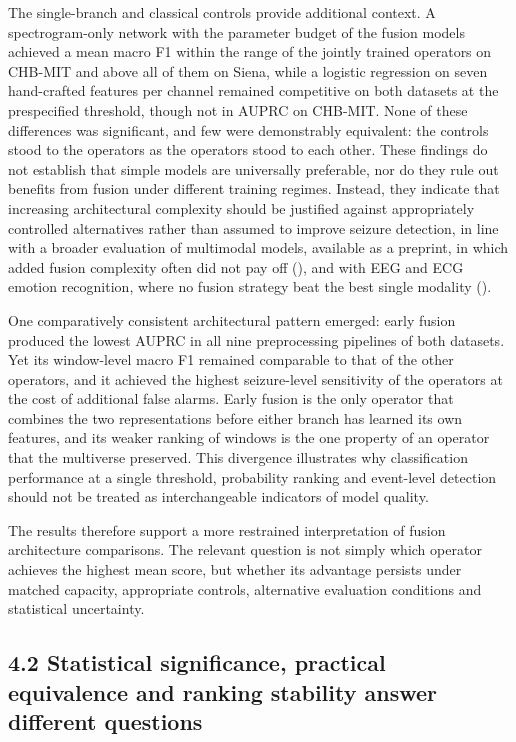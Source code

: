 \documentclass[11pt,a4paper]{article}
\begin{document}
The single-branch and classical controls provide additional context. A spectrogram-only
network with the parameter budget of the fusion models achieved a mean macro F1 within
the range of the jointly trained operators on CHB-MIT and above all of them on Siena,
while a logistic regression on seven hand-crafted features per channel remained
competitive on both datasets at the prespecified threshold, though not in AUPRC on
CHB-MIT. None of these differences was significant, and few were demonstrably
equivalent: the controls stood to the operators as the operators stood to each other.
These findings do not establish that simple models are universally preferable, nor do
they rule out benefits from fusion under different training regimes. Instead, they
indicate that increasing architectural complexity should be justified against
appropriately controlled alternatives rather than assumed to improve seizure detection,
in line with a broader evaluation of multimodal models, available as a preprint, in
which added fusion complexity often did not pay off (\citealp{Rheude_2025}), and with EEG and
ECG emotion recognition, where no fusion strategy beat the best single modality
(\citealp{Miantezila_Junior_2026}).

One comparatively consistent architectural pattern emerged: early fusion produced the
lowest AUPRC in all nine preprocessing pipelines of both datasets. Yet its window-level
macro F1 remained comparable to that of the other operators, and it achieved the highest
seizure-level sensitivity of the operators at the cost of additional false alarms. Early
fusion is the only operator that combines the two representations before either branch
has learned its own features, and its weaker ranking of windows is the one property of
an operator that the multiverse preserved. This divergence illustrates why
classification performance at a single threshold, probability ranking and event-level
detection should not be treated as interchangeable indicators of model quality.

The results therefore support a more restrained interpretation of fusion architecture
comparisons. The relevant question is not simply which operator achieves the highest
mean score, but whether its advantage persists under matched capacity, appropriate
controls, alternative evaluation conditions and statistical uncertainty.

\subsection{4.2 Statistical significance, practical equivalence and ranking stability answer different questions}\label{statistical-significance-practical-equivalence-and-ranking-stability-answer-different-questions}
\end{document}
